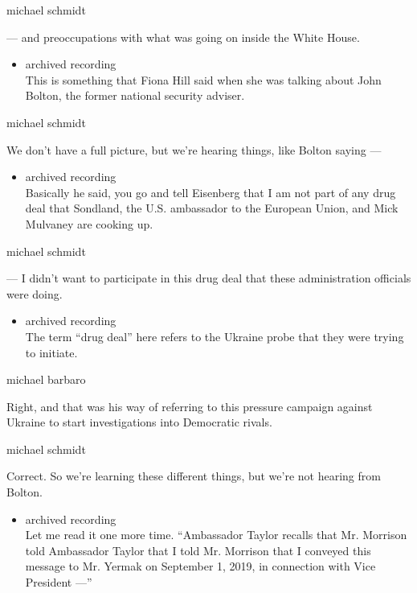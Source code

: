 michael schmidt

--- and preoccupations with what was going on inside the White House.

\begin{itemize}
\tightlist
\item
  archived recording\\
  This is something that Fiona Hill said when she was talking about John
  Bolton, the former national security adviser.
\end{itemize}

michael schmidt

We don't have a full picture, but we're hearing things, like Bolton
saying ---

\begin{itemize}
\tightlist
\item
  archived recording\\
  Basically he said, you go and tell Eisenberg that I am not part of any
  drug deal that Sondland, the U.S. ambassador to the European Union,
  and Mick Mulvaney are cooking up.
\end{itemize}

michael schmidt

--- I didn't want to participate in this drug deal that these
administration officials were doing.

\begin{itemize}
\tightlist
\item
  archived recording\\
  The term ``drug deal'' here refers to the Ukraine probe that they were
  trying to initiate.
\end{itemize}

michael barbaro

Right, and that was his way of referring to this pressure campaign
against Ukraine to start investigations into Democratic rivals.

michael schmidt

Correct. So we're learning these different things, but we're not hearing
from Bolton.

\begin{itemize}
\tightlist
\item
  archived recording\\
  Let me read it one more time. ``Ambassador Taylor recalls that Mr.
  Morrison told Ambassador Taylor that I told Mr. Morrison that I
  conveyed this message to Mr. Yermak on September 1, 2019, in
  connection with Vice President ---''
\end{itemize}

